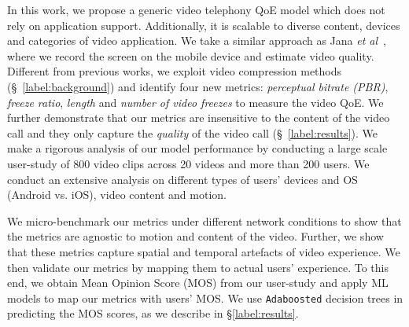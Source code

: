 In this work, we propose a generic video telephony QoE model which does not rely on application support. Additionally, it is scalable to diverse content, devices and categories of video application. We take a similar approach as Jana {\em et al}~\cite{jana2016qoe}, where we record the screen on the mobile device and estimate video quality. Different from previous works, we exploit video compression methods (\S~\ref{label:background}) and identify four new metrics: {\em perceptual bitrate (PBR)}, {\em freeze ratio}, {\em length} and {\em number of video freezes} to measure 
the video QoE. We further demonstrate that our metrics are insensitive to the content of the video call and they only capture the {\em quality} of the video call (\S~\ref{label:results}). We make a rigorous analysis of our model performance by conducting a large scale user-study of 800 video clips across 20 videos and more than 200 users. We conduct an extensive analysis on different types of users' devices and OS (Android vs. iOS), video content and motion.  

We micro-benchmark our metrics under different network conditions to show that the metrics are agnostic to motion and content of the video.
Further, we show that these metrics capture spatial and temporal artefacts of video experience.
We then validate our metrics by mapping them to actual users' experience. To this end, we obtain Mean Opinion Score (MOS) from our user-study and apply ML models to map our metrics with users' MOS.
We use \texttt{Adaboosted} decision trees in predicting the MOS scores, as we describe in \S \ref{label:results}.


